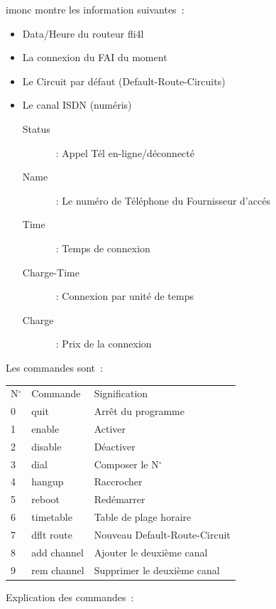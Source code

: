   imonc montre les information suivantes~:

  \begin{itemize}
  \item Data/Heure du routeur fli4l

  \item La connexion du FAI du moment

  \item Le Circuit par défaut (Default-Route-Circuits)

  \item Le canal ISDN (numéris)
    \begin{description}
    \item[Status]~:         Appel Tél en-ligne/déconnecté
    \item[Name]~:           Le numéro de Téléphone du Fournisseur d'accés
    \item[Time]~:           Temps de connexion
    \item[Charge-Time]~:    Connexion par unité de temps
    \item[Charge]~:         Prix de la connexion
    \end{description}
  \end{itemize}

  Les commandes sont~:

  \begin{tabular}{lll}
    N$^\circ$   &Commande              &Signification\\
    0   &quit                &Arrêt du programme\\
    1   &enable              &Activer\\
    2   &disable             &Déactiver\\
    3   &dial                &Composer le N$^\circ$\\
    4   &hangup              &Raccrocher\\
    5   &reboot              &Redémarrer\\
    6   &timetable           &Table de plage horaire \\
    7   &dflt route          &Nouveau Default-Route-Circuit \\
    8   &add channel         &Ajouter le deuxième canal\\
    9   &rem channel         &Supprimer le deuxième canal\\
  \end{tabular}

  \medskip

  \noindent Explication des commandes~:

